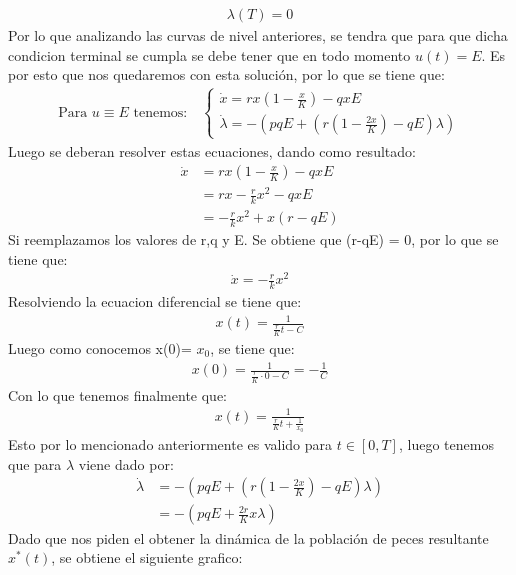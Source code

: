 \begin{itemize}
\begin{align}
	\lambda(T)=0 
\end{align}
Por lo que analizando las curvas de nivel anteriores, se tendra que para que dicha condicion terminal se cumpla se debe tener que en todo momento $u(t)=E$. Es por esto que nos quedaremos con esta solución, por lo que se tiene que:
\begin{align}
    \text{Para } u \equiv E \text{ tenemos:} \quad
    \begin{cases}
        \dot{x} = r x \left(1 - \frac{x}{K}\right) - q x E \\
        \dot{\lambda} = -(p q E + \left(r \left(1 - \frac{2x}{K}\right) - q E\right)\lambda)
    \end{cases}
\end{align}
Luego se deberan resolver estas ecuaciones, dando como resultado:
\begin{align}
	\dot{x} & = r x \left(1 - \frac{x}{K}\right) - q x E \\
	        &= rx - \frac{r}{k}x^{2} - qxE\\
			&= -\frac{r}{k}x^{2} + x(r-qE)
\end{align}
Si reemplazamos los valores de r,q y E. Se obtiene que (r-qE) = 0, por lo que se tiene que:
\begin{align}
	\dot{x} = -\frac{r}{k}x^{2}
\end{align}
Resolviendo la ecuacion diferencial se tiene que:
\begin{align}
	x(t) = \frac{1}{\frac{r}{K}t - C}
\end{align}
Luego como conocemos x(0)= $x_0$, se tiene que:
\begin{align}
	x(0) = \frac{1}{\frac{r}{K} \cdot 0 - C} = -\frac{1}{C}
\end{align}
Con lo que tenemos finalmente que:
\begin{align}
	x(t) = \frac{1}{\frac{r}{K}t + \frac{1}{x_0}}
\end{align}
Esto por lo mencionado anteriormente es valido para $t \in \left[ 0,T\right]$, luego tenemos que para $\lambda$ viene dado por:
\begin{align}
	\dot{\lambda} &= -(p q E + \left(r \left(1 - \frac{2x}{K}\right) - q E\right)\lambda)\\
	& = - (pqE + \frac{2r}{K}x \lambda)
\end{align}
Dado que nos piden el obtener la dinámica de la población de peces resultante $x^{*}(t)$, se obtiene el siguiente grafico:
\begin{figure}[H]

\end{figure}
\end{itemize}
